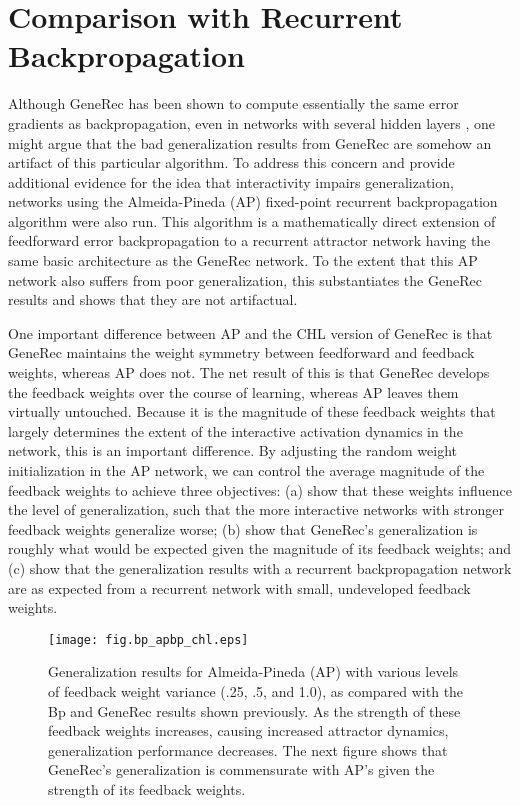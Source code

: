 \documentclass[12pt,twoside]{article}
\begin{document}
\section{Comparison with Recurrent Backpropagation}

Although GeneRec has been shown to compute essentially the same error
gradients as backpropagation, even in networks with several hidden
layers \cite{OReilly96}, one might argue that the bad generalization
results from GeneRec are somehow an artifact of this particular
algorithm.  To address this concern and provide additional evidence
for the idea that interactivity impairs generalization, networks using
the Almeida-Pineda (AP) fixed-point recurrent backpropagation
algorithm \cite{Almeida87,Pineda87a,Pineda87b,Pineda88} were also run.
This algorithm is a mathematically direct extension of feedforward
error backpropagation to a recurrent attractor network having the same
basic architecture as the GeneRec network.  To the extent that this AP
network also suffers from poor generalization, this substantiates the
GeneRec results and shows that they are not artifactual.

One important difference between AP and the CHL version of GeneRec is
that GeneRec maintains the weight symmetry between feedforward and
feedback weights, whereas AP does not.  The net result of this is that
GeneRec develops the feedback weights over the course of learning,
whereas AP leaves them virtually untouched.  Because it is the
magnitude of these feedback weights that largely determines the extent
of the interactive activation dynamics in the network, this is an
important difference.  By adjusting the random weight initialization
in the AP network, we can control the average magnitude of the
feedback weights to achieve three objectives: (a) show that these
weights influence the level of generalization, such that the more
interactive networks with stronger feedback weights generalize worse;
(b) show that GeneRec's generalization is roughly what would be
expected given the magnitude of its feedback weights; and (c) show
that the  generalization
results with a recurrent backpropagation network are as expected from
a recurrent network with small, undeveloped feedback weights.

\begin{figure}
  \centering\texttt{[image: fig.bp\_apbp\_chl.eps]}
  \caption{\small Generalization results for Almeida-Pineda (AP) with
    various levels of feedback weight variance (.25, .5, and 1.0), as
    compared with the Bp and GeneRec results shown previously.  As the
    strength of these feedback weights increases, causing increased
    attractor dynamics, generalization performance decreases.  The
    next figure shows that GeneRec's generalization is commensurate
    with AP's given the strength of its feedback weights.} 
  \label{fig.bp_apbp_chl}
\end{figure}
\end{document}
